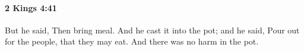 
		\paragraph{2 Kings 4:41} %
			\label{2KINGS-4-41}

			But he said, Then bring meal. And he cast it into the pot; and he said, Pour out for the people, that they may eat. And there was no harm in the pot.


